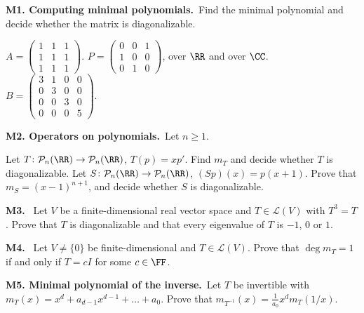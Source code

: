\documentclass[10pt]{scrartcl}
\newcommand{\LL}{\mathcal L}
\newcommand{\PP}{\mathcal P}
\newenvironment{prob}{\par\bigskip\noindent\begin{minipage}{\linewidth}\setlength{\parskip}{4pt}}{\end{minipage}\par}
\begin{document}
\begin{prob}
\textbf{M1. Computing minimal polynomials.}\ Find the minimal polynomial and decide whether the matrix is diagonalizable.
\begin{enumerate}[(a)]
  \ii $A=\begin{pmatrix}1&1&1\\1&1&1\\1&1&1\end{pmatrix}$.
  \ii $P=\begin{pmatrix}0&0&1\\1&0&0\\0&1&0\end{pmatrix}$, over $\RR$ and over $\CC$.
  \ii $B=\begin{pmatrix}3&1&0&0\\0&3&0&0\\0&0&3&0\\0&0&0&5\end{pmatrix}$.
\end{enumerate}
\end{prob}

\begin{prob}
\textbf{M2. Operators on polynomials.}\ Let $n\ge1$.
\begin{enumerate}[(a)]
  \ii Let $T\colon\PP_n(\RR)\to\PP_n(\RR)$, $T(p)=xp'$. Find $m_T$ and decide whether $T$ is diagonalizable.
  \ii Let $S\colon\PP_n(\RR)\to\PP_n(\RR)$, $(Sp)(x)=p(x+1)$. Prove that $m_S=(x-1)^{n+1}$, and decide whether $S$ is diagonalizable.
\end{enumerate}
\end{prob}

\begin{prob}
\textbf{M3. }\ Let $V$ be a finite-dimensional real vector space and $T\in\LL(V)$ with $T^3=T$. Prove that $T$ is diagonalizable and that every eigenvalue of $T$ is $-1$, $0$ or $1$.
\end{prob}

\begin{prob}
\textbf{M4. }\ Let $V\ne\{0\}$ be finite-dimensional and $T\in\LL(V)$. Prove that $\deg m_T=1$ if and only if $T=cI$ for some $c\in\FF$.
\end{prob}

\begin{prob}
\textbf{M5. Minimal polynomial of the inverse.}\ Let $T$ be invertible with $m_T(x)=x^d+a_{d-1}x^{d-1}+\dots+a_0$. Prove that $m_{T^{-1}}(x)=\frac1{a_0}x^dm_T(1/x)$.
\end{prob}
\end{document}
